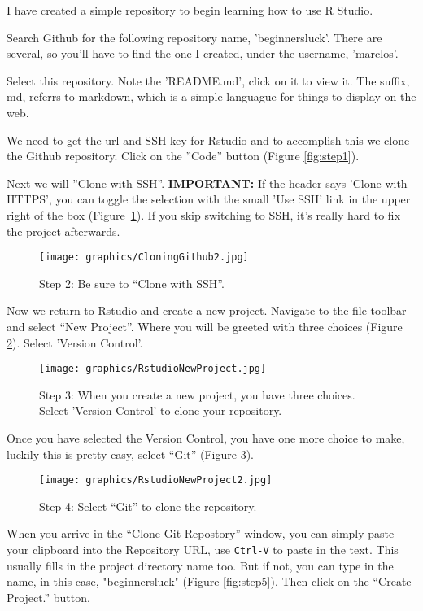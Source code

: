 \documentclass[12pt]{../SOP4_alpha}\usepackage[]{graphicx}\usepackage[]{xcolor}
\begin{document}
\NP I have created a simple repository to begin learning how to use R Studio.

\NP Search Github for the following repository name, 'beginnersluck'. There are several, so you'll have to find the one I created, under the username, 'marclos'. 

\NP Select this repository. Note the 'README.md', click on it to view it. The suffix, md, referrs to markdown, which is a simple languague for things to display on the web.

\NP We need to get the url and SSH key for Rstudio and to accomplish this we clone the Github repository. Click on the ''Code'' button (Figure \ref{fig:step1}).


\NP Next we will ''Clone with SSH''. \textbf{IMPORTANT:} If the header says 'Clone with HTTPS', you can toggle the selection with the small 'Use SSH' link in the upper right of the box (Figure~\ref{fig:step2}). If you skip switching to SSH, it's really hard to fix the project afterwards. 

\begin{figure}[H]
\centering
\texttt{[image: graphics/CloningGithub2.jpg]}
\caption{Step 2: Be sure to ``Clone with SSH''.}
\label{fig:step2}
\end{figure}

\NP Now we return to Rstudio and create a new project. Navigate to the file toolbar and select ``New Project''. Where you will be greeted with three choices (Figure \ref{fig:step3}). Select 'Version Control'. 
\begin{figure}[H]
\centering
\texttt{[image: graphics/RstudioNewProject.jpg]}
\caption{Step 3: When you create a new project, you have three choices. Select 'Version Control' to clone your repository.}
\label{fig:step3}
\end{figure}

\NP Once you have selected the Version Control, you have one more choice to make, luckily this is pretty easy, select ``Git'' (Figure \ref{fig:step4}).

\begin{figure}[H]
\centering
\texttt{[image: graphics/RstudioNewProject2.jpg]}
\caption{Step 4: Select ``Git'' to clone the repository.}
\label{fig:step4}
\end{figure}

When you arrive in the ``Clone Git Repostory'' window, you can simply paste your clipboard into the Repository URL, use \texttt{Ctrl-V} to paste in the text. This usually fills in the project directory name too. But if not, you can type in the name, in this case, "beginnersluck" (Figure \ref{fig:step5}). Then click on the ``Create Project.'' button. 
\end{document}
